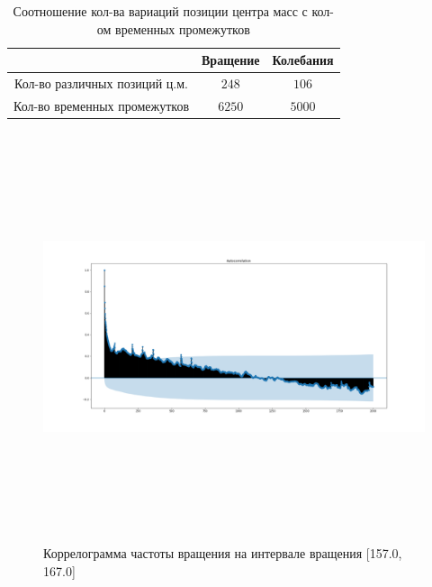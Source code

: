 \documentclass[a4paper,12pt]{article} %
\begin{document}
	\begin{table}[H]
		\caption{Соотношение кол-ва вариаций позиции центра масс с кол-ом временных промежутков}
		\label{tab:my_label1}
		\begin{center}
			\vspace{5mm}
			\begin{tabular}{|c|c|c|}
				\hline
				 & Вращение & Колебания\\
				\hline
				Кол-во различных позиций ц.м. & $ 248 $ & $ 106 $\\
				\hline
				Кол-во временных промежутков & $ 6250 $ & $ 5000 $\\
				\hline
			\end{tabular}
		\end{center}
	\end{table}

	\begin{figure}[H]		
		\includegraphics[width = 18cm, height = 12cm]{autocor_rot.png}
		\caption{Коррелограмма частоты вращения на интервале вращения [157.0, 167.0]}
		\label{fig:autocor_rot}
	\end{figure}
\end{document}
